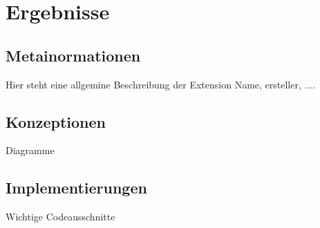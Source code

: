 \chapter{Ergebnisse}
\label{chap:ergebnisse}

\section{Metainormationen}
Hier steht eine allgemine Beschreibung der Extension
Name, ersteller, ....

\section{Konzeptionen}
Diagramme

\section{Implementierungen}
Wichtige Codeausschnitte